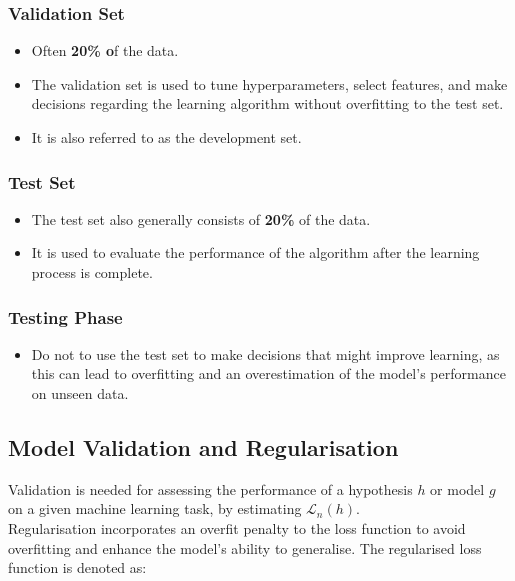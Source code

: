 \subsubsection*{Validation Set}
\begin{itemize}
    \item Often \textbf{20\% o}f the data.
    \item The validation set is used to tune hyperparameters, select features, and make decisions regarding the learning algorithm without overfitting to the test set. 
    \item It is also referred to as the development set.
\end{itemize}

\subsubsection*{Test Set}
\begin{itemize}
    \item The test set also generally consists of\textbf{ 20\% }of the data.
    \item It is used to evaluate the performance of the algorithm after the learning process is complete.
\end{itemize}

\subsubsection*{Testing Phase}
\begin{itemize}
    \item Do not to use the test set to make decisions that might improve learning, as this can lead to overfitting and an overestimation of the model's performance on unseen data.
\end{itemize}


\subsection{Model Validation and Regularisation}

Validation is needed for assessing the performance of a hypothesis \( h \) or model \( g \) on a given machine learning task, by estimating \( \mathcal{L}_n (h) \).\\

Regularisation incorporates an overfit penalty to the loss function to avoid overfitting and enhance the model's ability to generalise. The regularised loss function is denoted as:

